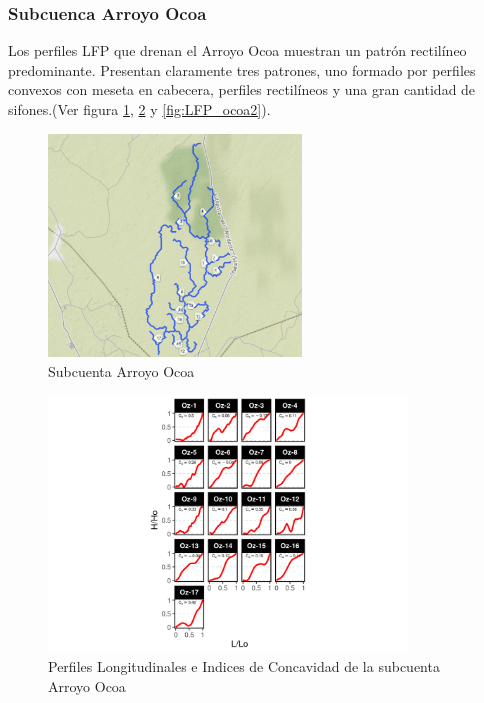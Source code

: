 \documentclass[11pt,]{article}
\begin{document}
\newpage

\subsubsection{Subcuenca Arroyo Ocoa}\label{subcuenca-arroyo-ocoa}

Los perfiles LFP que drenan el Arroyo Ocoa muestran un patrón rectilíneo
predominante. Presentan claramente tres patrones, uno formado por
perfiles convexos con meseta en cabecera, perfiles rectilíneos y una
gran cantidad de sifones.(Ver figura \ref{fig:LFP_ocoa0},
\ref{fig:LFP_ocoa1} y \ref{fig:LFP_ocoa2}).

\begin{figure}
\centering
\includegraphics[width=0.60000\textwidth]{Productos Generados/p_Ocoa.png}
\caption{\label{fig:LFP_ocoa0} Subcuenta Arroyo Ocoa}
\end{figure}

\begin{figure}
\centering
\includegraphics[width=0.85000\textwidth]{Productos Generados/p_c_ocoa1.png}
\caption{\label{fig:LFP_ocoa1} Perfiles Longitudinales e Indices de
Concavidad de la subcuenta Arroyo Ocoa}
\end{figure}
\end{document}
